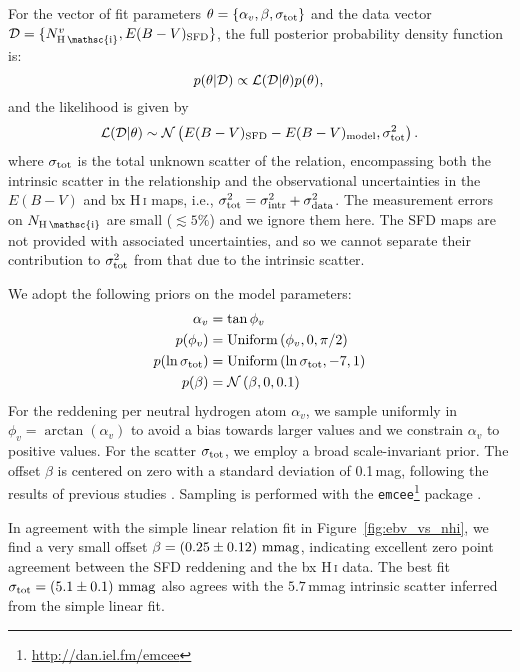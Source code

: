 \documentclass[iop,apj]{emulateapj}
\makeatletter
\def\testbx{bx}%
\DeclareRobustCommand{\ion}[2]{%
\relax\ifmmode
\ifx\testbx\f@series
{\mathbf{#1\,\mathsc{#2}}}\else
{\mathrm{#1\,\mathsc{#2}}}\fi
\else\textup{#1\,{\mdseries\textsc{#2}}}%
\fi}
\makeatother
\begin{document}
For the vector of fit parameters $\theta = \lbrace\alpha_{v}, \beta, \sigma_{\rm tot}\rbrace$ and the data vector $\mathcal{D} = \lbrace N_{\ion{H}{i}}^v, E(B-V)_{\rm SFD}\rbrace$, the full posterior probability density function is:
%
\begin{equation}
	p(\theta | \mathcal{D}) \propto \mathcal{L}(\mathcal{D} | \theta) p(\theta), \\
	\label{eq:posterior}
\end{equation}
%
and the likelihood is given by
%
\begin{equation}
	\mathcal{L}(\mathcal{D} | \theta) \sim \mathcal{N}\left(E(B-V)_{\rm SFD} - E(B-V)_{\rm model} ,\sigma_{\rm tot}^2\right).
    \label{eq:likelihood}
\end{equation}
where $\sigma_{\rm tot}$ is the total unknown scatter of the relation, encompassing both the intrinsic scatter in the relationship and the observational uncertainties in the $E(B-V)$ and \ion{H}{i} maps, i.e., $\sigma^2_{\rm tot} = \sigma^2_{\rm intr} + \sigma^2_{\rm data}$. The measurement errors on $N_\ion{H}{i}$ are small ($\lesssim 5\%$) and we ignore them here. The SFD maps are not provided with associated uncertainties, and so we cannot separate their contribution to $\sigma^2_{\rm tot}$ from that due to the intrinsic scatter.

We adopt the following priors on the model parameters:
%
\begin{align}
    \label{eq:prior}
    \alpha_v & = \tan\phi_v\nonumber\\
    p(\phi_v) & = \mathrm{Uniform}\left(\phi_v, 0, \pi/2\right)\\
    p(\ln\sigma_{\rm tot}) & = \mathrm{Uniform}\left(\ln\sigma_{\rm tot}, -7, 1\right)\nonumber \\
    p(\beta) & = \mathcal{N}\left(\beta, 0, 0.1\right) \nonumber
\end{align}
For the reddening per neutral hydrogen atom $\alpha_v$, we sample uniformly in $\phi_v = \arctan(\alpha_v)$ to avoid a bias towards larger values and we constrain $\alpha_v$ to positive values. For the scatter $\sigma_{\rm tot}$, we employ a broad scale-invariant prior. The offset $\beta$ is centered on zero with a standard deviation of 0.1\,mag, following the results of previous studies \citep{Schlafly+etal_2014, Meisner+Finkbeiner_2015}. Sampling is performed with the \texttt{emcee}\footnote{\url{http://dan.iel.fm/emcee}} package \citep{Foreman-Mackey+etal_2013}.

In agreement with the simple linear relation fit in Figure~\ref{fig:ebv_vs_nhi}, we find a very small offset $\beta = \left(0.25\pm 0.12\right)\, \rm mmag$, indicating excellent zero point agreement between the SFD reddening and the \ion{H}{i} data. The best fit $\sigma_{\rm tot} =\left(5.1\pm 0.1\right)\, \rm mmag$ also agrees with the $5.7$\,mmag intrinsic scatter inferred from the simple linear fit. 
\end{document}
